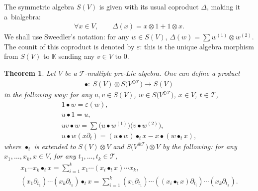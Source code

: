 \documentclass[11pt]{article}
\numberwithin{equation}{section}
\numberwithin{equation}{section}
\newtheorem{Theorem}{Theorem}[section]
\newcommand{\K}{\mathbb{K}}
\newcommand{\T}{\mathcal{T}}
\begin{document}
\begin{Notation}
The symmetric algebra $S(V)$ is given with its usual coproduct $\Delta$, making it a~bialgebra:
\begin{gather*}
\forall x\in V,\qquad \Delta(x)=x\otimes 1+1\otimes x.
\end{gather*}
We shall use Sweedler's notation: for any $w\in S(V)$, $\Delta(w)=\sum w^{(1)}\otimes w^{(2)}$.
The counit of this coproduct is denoted by $\varepsilon$: this is the unique algebra morphism from $S(V)$ to $\K$ sending any $v\in V$ to $0$.
\end{Notation}

\begin{Theorem}
Let $V$ be a $\T$-multiple pre-Lie algebra. One can define a product
\begin{gather*}
\bullet\colon\ S(V)\otimes S\big(V^{\oplus\T}\big)\longrightarrow S(V)
\end{gather*}
in the following way: for any $u,v \in S(V)$, $w\in S\big(V^{\oplus\T}\big)$, $x\in V$, $t\in \T$,
\begin{gather*}
1\bullet w=\varepsilon(w),
\\
u\bullet 1=u,
\\
uv\bullet w=\sum\big(u\bullet w^{(1)}\big)\big(v\bullet w^{(2)}\big),
\\
u\bullet w (x\partial_t)=(u\bullet w)\bullet_t x-x\bullet (w\bullet_t x),
\end{gather*}
where $\bullet_t$ is extended to $S(V)\otimes V$ and $S\big(V^{\oplus\T}\big)\otimes V$
by the following: for any $x_1,\dots,x_k,x\in V$, for any $t_1,\dots,t_k \in \T$,
\begin{gather*}
x_1\cdots x_k \bullet_t x=\sum_{i=1}^k x_1\cdots (x_i\bullet_t x)\cdots x_k,
\\
(x_1\partial_{t_1})\cdots (x_k\partial_{t_k}) \bullet_t x
=\sum_{i=1}^k (x_1\partial_{t_1})\cdots ((x_i\bullet_t x)\partial_{t_i})\cdots (x_k\partial_{t_k}).
\end{gather*}
\end{Theorem}
\end{document}
